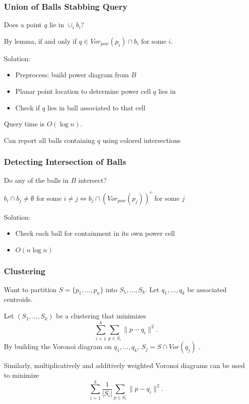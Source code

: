 \documentclass{beamer}
\begin{document}
\begin{frame}
  \frametitle{Union of Balls Stabbing Query}

  Does a point $q$ lie in $\cup_i b_i$?

  By lemma, if and only if $q \in Vor_{pow}(p_i) \cap b_i$ for some $i$.

  \vspace{.5cm}
  Solution:
  \begin{itemize}
    \item Preprocess: build power diagram from $B$
    \item Planar point location to determine power cell $q$ lies in
    \item Check if $q$ lies in ball associated to that cell
  \end{itemize}

  Query time is $O( \log n)$.

  Can report all balls containing $q$ using colored intersections \cite{ravi}

\end{frame}

\begin{frame}
  \frametitle{Detecting Intersection of Balls}

  Do any of the balls in $B$ intersect?

  \begin{lemma}
    $b_i \cap b_j \neq \emptyset$ for some $i \neq j \Leftrightarrow b_j \cap (Vor_{pow}(p_j))^c$ for some $j$
  \end{lemma}

  Solution:
  \begin{itemize}
    \item Check each ball for containment in its own power cell
    \item $O(n \log n)$
  \end{itemize}

\end{frame}

\begin{frame}
  \frametitle{Clustering}

  Want to partition $S = \{p_1,\ldots, p_n\}$ into $S_1, \ldots, S_k$. Let $q_1, \ldots, q_k$ be associated centroids.

  \begin{theorem}
    Let $(S_1, \ldots, S_k)$ be a clustering that minimizes
    \[ \sum_{i=1}^k \sum_{p \in S_i} \| p - q_i \|^2 .\]
    By building the Voronoi diagram on $q_1, \ldots, q_k$, $S_j = S \cap Vor(q_j)$ \cite{inaba_clustering}.
  \end{theorem}

  Similarly, multiplicatively and additively weighted Voronoi diagrams can be used to minimize
  \[ \sum_{i=1}^k \frac{1}{|S_i|} \sum_{p \in S_i} \| p - q_i \|^2 .\]

\end{frame}
\end{document}

